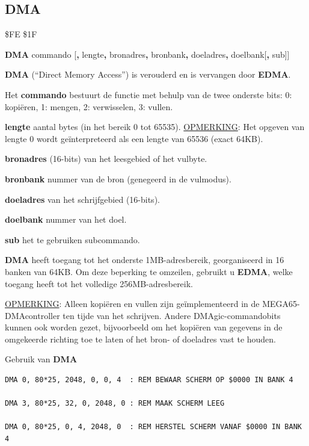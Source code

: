 \subsection{DMA}
\label{BASIC 65 Commands!DMA}
\begin{description}[leftmargin=2cm,style=nextline]
\item [Token:]    \$FE \$1F
\item [Formaat:]   {\bf DMA} commando [{\bf,} lengte{\bf,} bronadres{\bf,} bronbank{\bf,} doeladres{\bf,} doelbank[{\bf,} sub]]\item [Gebruik:]    {\bf DMA} (``Direct Memory Access'') is verouderd en is vervangen door {\bf EDMA}.

                  Het {\bf commando} bestuurt de functie met behulp van de twee onderste bits: 0: kopiëren, 1: mengen, 2: verwisselen, 3: vullen.

{\bf lengte} aantal bytes (in het bereik 0 tot 65535). \underline{OPMERKING}: Het opgeven van lengte 0 wordt geïnterpreteerd als een lengte van 65536 (exact 64KB).

                  {\bf bronadres} (16-bits) van het leesgebied of het vulbyte.

                  {\bf bronbank} nummer van de bron (genegeerd in de vulmodus).

                  {\bf doeladres} van het schrijfgebied (16-bits).

                  {\bf doelbank} nummer van het doel.

                  {\bf sub} het te gebruiken subcommando.

\item [Opmerkingen:]  {\bf DMA} heeft toegang tot het onderste 1MB-adresbereik, georganiseerd in 16 banken van 64KB. Om deze beperking te omzeilen, gebruikt u {\bf EDMA}, welke toegang heeft tot het volledige 256MB-adresbereik.

                  \underline{OPMERKING}: Alleen kopiëren en vullen zijn geïmplementeerd in de MEGA65-DMAcontroller ten tijde van het schrijven. Andere DMAgic-commandobits kunnen ook worden gezet, bijvoorbeeld om het kopiëren van gegevens in de omgekeerde richting toe te laten of het bron- of doeladres vast te houden.

\item [Voorbeelden:] Gebruik van {\bf DMA}

\begin{tcolorbox}[colback=black,coltext=white]
\verbatimfont{\codefont}
\begin{verbatim}
DMA 0, 80*25, 2048, 0, 0, 4  : REM BEWAAR SCHERM OP $0000 IN BANK 4

DMA 3, 80*25, 32, 0, 2048, 0 : REM MAAK SCHERM LEEG

DMA 0, 80*25, 0, 4, 2048, 0  : REM HERSTEL SCHERM VANAF $0000 IN BANK 4
\end{verbatim}
\end{tcolorbox}
\end{description}

